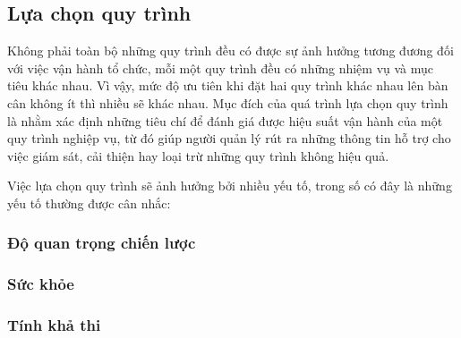 \subsection{Lựa chọn quy trình}
Không phải toàn bộ những quy trình đều có được sự ảnh hưởng tương đương đối với việc vận hành tổ chức, mỗi một quy trình đều có những nhiệm vụ và mục tiêu khác nhau. Vì vậy, mức độ ưu tiên khi đặt hai quy trình khác nhau lên bàn cân không ít thì nhiều sẽ khác nhau. Mục đích của quá trình lựa chọn quy trình là nhằm xác định những tiêu chí để đánh giá được hiệu suất vận hành của một quy trình nghiệp vụ, từ đó giúp người quản lý rút ra những thông tin hỗ trợ cho việc giám sát, cải thiện hay loại trừ những quy trình không hiệu quả.

Việc lựa chọn quy trình sẽ ảnh hưởng bởi nhiều yếu tố, trong số có đây là những yếu tố thường được cân nhắc:

\subsubsection{Độ quan trọng chiến lược}
    
\subsubsection{Sức khỏe}
    
\subsubsection{Tính khả thi}
    